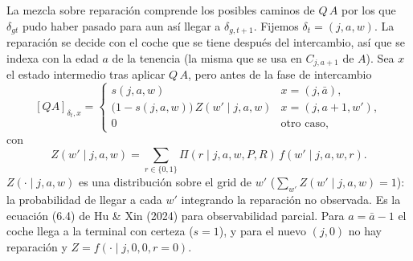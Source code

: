 \documentclass{article}
\begin{document}

La mezcla sobre reparación comprende los posibles caminos de $Q\,A$ por los que $\delta_{gt}$ pudo haber pasado para aun así llegar a $\delta_{g,t+1}$. Fijemos $\delta_t=(j,a,w)$. La reparación se decide con el coche que se tiene después del intercambio, así que se indexa con la edad $a$ de la tenencia (la misma que se usa en $C_{j,a+1}$ de $A$). Sea $x$ el estado intermedio tras aplicar $Q\,A$, pero antes de la fase de intercambio
$$[QA]_{\delta_t,x}=\begin{cases}
s(j,a,w) & x=(j,\bar{a}),\\[2pt]
\big(1-s(j,a,w)\big)\,Z(w'\mid j,a,w) & x=(j,a+1,w'),\\[2pt]
0 & \text{otro caso},
\end{cases}$$
con
$$Z(w'\mid j,a,w)=\sum_{r\in\{0,1\}}\Pi(r\mid j,a,w,P,R)\,f(w'\mid j,a,w,r).$$
$Z(\cdot\mid j,a,w)$ es una distribución sobre el grid de $w'$ ($\sum_{w'}Z(w'\mid j,a,w)=1$): la probabilidad de llegar a cada $w'$ integrando la reparación no observada. Es la ecuación (6.4) de Hu \& Xin (2024) para observabilidad parcial. Para $a=\bar{a}-1$ el coche llega a la terminal con certeza ($s=1$), y para el nuevo $(j,0)$ no hay reparación y $Z=f(\cdot\mid j,0,0,r=0)$.
\end{document}
